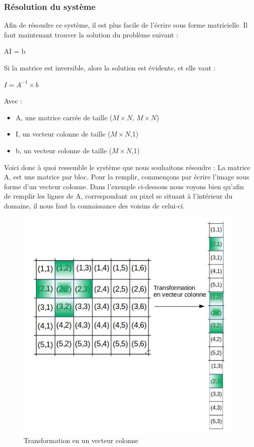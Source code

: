\subsubsection{Résolution du système}
Afin de résoudre ce système, il est plus facile de l'écrire sous forme matricielle. Il faut maintenant trouver la solution du problème suivant : 
\begin{center}
 AI = b 
\end{center}
Si la matrice est inversible, alors la solution est évidente, et elle vaut : 
\begin{center}
$I = A^{-1}\times b$
\end{center} 
Avec : 
\begin{itemize}
\item A, une matrice carrée de taille ($M\times N$, $M\times N$)
\item I, un vecteur colonne de taille ($M\times N$,1)
\item b, un vecteur colonne de taille ($M\times N$,1)
\end{itemize}
Voici donc à quoi ressemble le système que nous souhaitons résoudre :\newline
La matrice A, est une matrice par bloc. Pour la remplir, commençons par écrire l'image sous forme d'un vecteur colonne. Dans l'exemple ci-dessous nous voyons bien qu'afin de remplir les lignes de A, correspondant au pixel se situant à l'intérieur du domaine, il nous faut la connaissance des voisins de celui-ci.
\begin{figure}[!h]
\centering
\includegraphics[scale=0.5]{Images/laplacienIJ.png}
\caption{Transformation en un vecteur colonne}
\end{figure}

